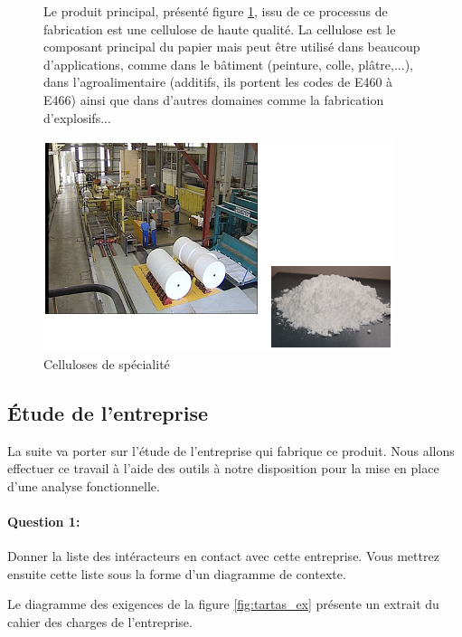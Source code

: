 \begin{figure}[htbp]
\begin{minipage}{0.55\linewidth}
Le produit principal, présenté figure \ref{fig:tartas6}, issu de ce processus de fabrication est une cellulose de haute qualité. La cellulose est le composant principal du papier mais peut être utilisé dans beaucoup d'applications, comme dans le bâtiment (peinture, colle, plâtre,...), dans l'agroalimentaire (additifs, ils portent les codes de E460 à E466) ainsi que dans d'autres domaines comme la fabrication d'explosifs...
\end{minipage}
\hfill
\begin{minipage}{0.48\linewidth}
\begin{center}
\includegraphics[width=0.7\linewidth]{img/produits.png}
\caption{Celluloses de spécialité}
\label{fig:tartas6}
\end{center}
\end{minipage}
\end{figure}

\subsection{Étude de l'entreprise}

La suite va porter sur l'étude de l'entreprise qui fabrique ce produit. Nous allons effectuer ce travail à l'aide des outils à notre disposition pour la mise en place d'une analyse fonctionnelle.

\paragraph{Question 1:}

Donner la liste des intéracteurs en contact avec cette entreprise. Vous mettrez ensuite cette liste sous la forme d'un diagramme de contexte.

Le diagramme des exigences de la figure \ref{fig:tartas_ex} présente un extrait du cahier des charges de l'entreprise. 

